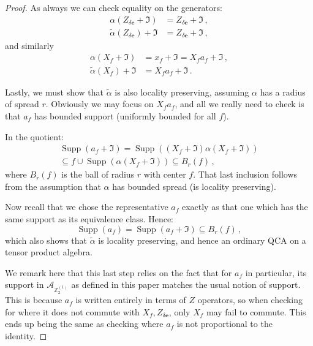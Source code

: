 \documentclass[10pt,a4paper]{amsart}
\newcommand{\Z}{{\mathbb Z}}
\newcommand{\be}{\begin{equation}}
\newcommand{\ee}{\end{equation}}
\newcommand{\mc}[1]{\mathcal{#1}}
\newcommand{\paren}[1]{\left( #1 \right)}
\begin{document}
\begin{proof}
 As always we can check equality on the generators:
 \begin{align}
  \alpha(Z_{\delta \bm{e}} + \mathfrak{I}) &= Z_{\delta \bm{e}} + \mathfrak{I} \,, \\
  \tilde{\alpha}(Z_{\delta \bm{e}}) + \mathfrak{I} &= Z_{\delta \bm{e}} + \mathfrak{I} \,,
 \end{align}
 and similarly
 \begin{align}
  \alpha(X_f + \mathfrak{I}) &= x_f + \mathfrak{I} = X_f a_f + \mathfrak{I} \,, \\
  \tilde{\alpha}(X_f) + \mathfrak{I} &= X_f a_f + \mathfrak{I} \,.
 \end{align}

 Lastly, we must show that $\tilde{\alpha}$ is also locality preserving, assuming $\alpha$ has a radius of spread $r$. Obviously we may focus on $X_f a_f$, and all we really need to check is that $a_f$ has bounded support (uniformly bounded for all $f$).

 In the quotient:
 \begin{multline}
  \operatorname{Supp}(a_f + \mathfrak{I}) = \operatorname{Supp}\paren{(X_f + \mathfrak{I}) \alpha(X_f + \mathfrak{I})} \\
  \subseteq f \cup \operatorname{Supp}(\alpha(X_f + \mathfrak{I})) \subseteq B_r(f) \,,
 \end{multline}
 where $B_r(f)$ is the ball of radius $r$ with center $f$. That last inclusion follows from the assumption that $\alpha$ has bounded spread (is locality preserving).

 Now recall that we chose the representative $a_f$ exactly as that one which has the same support as its equivalence class. Hence:
 \be
 \operatorname{Supp}(a_f) = \operatorname{Supp}(a_f + \mathfrak{I}) \subseteq B_r(f) \,,
 \ee
 which also shows that $\tilde{\alpha}$ is locality preserving, and hence an ordinary QCA on a tensor product algebra.

 We remark here that this last step relies on the fact that for $a_f$ in particular, its support in $\mc{A}_{\Z_2^{(1)}}$ as defined in this paper matches the usual notion of support. This is because $a_f$ is written entirely in terms of $Z$ operators, so when checking for where it does not commute with $X_f, Z_{\delta \bm{e}}$, only $X_f$ may fail to commute. This ends up being the same as checking where $a_f$ is not proportional to the identity.
\end{proof}
\end{document}
